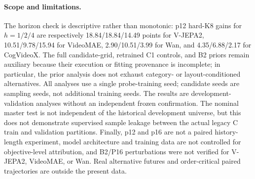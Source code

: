 \paragraph{Scope and limitations.}
The horizon check is descriptive rather than monotonic: p12 hard-K8 gains for
$h=1/2/4$ are respectively 18.84/18.84/14.49 points for V-JEPA2,
10.51/9.78/15.94 for VideoMAE, 2.90/10.51/3.99 for Wan, and
4.35/6.88/2.17 for CogVideoX.  The full candidate-grid, retrained C1 controls,
and B2 priors remain auxiliary because their execution or fitting provenance is
incomplete; in particular, the prior analysis does not exhaust category- or
layout-conditioned alternatives.  All analyses use a single probe-training
seed; candidate seeds are sampling seeds, not additional training seeds.  The
results are development-validation analyses without an independent frozen
confirmation.  The nominal master test is not independent of the historical
development universe, but this does not demonstrate supervised sample leakage
between the actual legacy C train and validation partitions.  Finally, p12 and
p16 are not a paired history-length experiment, model architecture and training
data are not controlled for objective-level attribution, and B2/P16
perturbations were not verified for V-JEPA2, VideoMAE, or Wan.  Real alternative
futures and order-critical paired trajectories are outside the present data.
